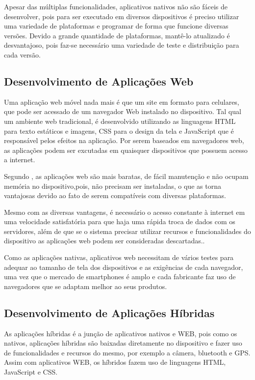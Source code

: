 		Apesar das múltiplas funcionalidades, aplicativos nativos não são fáceis de desenvolver, pois para ser executado em diversos dispositivos é preciso utilizar uma variedade de plataformas e programar de forma que funcione diversas versões. Devido a grande quantidade de plataformas, mantê-lo atualizado é desvantajoso, pois faz-se necessário uma variedade de teste e distribuição para cada versão.
	
	\subsection{Desenvolvimento de Aplicações Web}
	
		Uma aplicação web móvel nada mais é que um site em formato para celulares, que pode ser acessado de um navegador Web instalado no dispositivo. Tal qual um ambiente web tradicional, é desenvolvido utilizando as linguagens HTML para texto estáticos e imagens, CSS para o design da tela e JavaScript que é responsável pelos efeitos na aplicação. Por serem baseados em navegadores web, as aplicações podem ser excutadas em quaisquer dispositivos que possuem acesso a internet.\cite{emdesafios}
		
		Segundo , as aplicações web são mais baratas, de fácil manutenção e não ocupam memória no dispositivo,pois, não precisam ser instaladas, o que as torna vantajosas devido ao fato de serem compatíveis com diversas plataformas.
		
		Mesmo com as diversas vantagens, é necessário o acesso constante à internet em uma velocidade satisfatória para que haja uma rápida troca de dados com os servidores, além de que se o sistema precisar utilizar recursos e funcionalidades do dispositivo as aplicações web podem ser consideradas descartadas.\cite{toledo2016desenvolvimento}.
		
		Como as aplicações nativas, aplicativos web necessitam de vários testes para adequar ao tamanho de tela dos dispositivos e as exigências de cada navegador, uma vez que o mercado de smartphones é amplo e cada fabricante faz uso de navegadores que se adaptam melhor ao seus produtos.
			
	\subsection{Desenvolvimento de Aplicações Híbridas}
	
		As  aplicações híbridas é a junção de aplicativos nativos e WEB, pois como os nativos, aplicações híbridas são baixadas diretamente no dispositivo e fazer uso de funcionalidades e recursos do mesmo, por exemplo a câmera, bluetooth e GPS. Assim com aplicativos WEB, os híbridos fazem uso de linguagens HTML, JavaScript e CSS. \cite{tavares2016introduccao}
		
